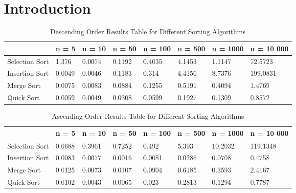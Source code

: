 \section{Introduction}

\begin{table}[ht]
    \centering
    \caption{Descending Order Results Table for Different Sorting Algorithms}
    \begin{tabular}[t]{|l| l l l l l l l|} 
    \hline
    & n = 5 & n = 10 & n = 50 & n = 100 & n = 500 & n = 1000 & n = 10 000\\ [0.5ex] 
    \hline
    Selection Sort & 1.376 &	0.0074 & 0.1192 & 0.4035 & 4.1453 & 1.1147 & 72.5723 \\ 
    \hline
    Insertion Sort &  0.0049 & 0.0046	& 0.1183	& 0.314 & 	4.4156	& 8.7376	& 199.0831\\
    \hline
    Merge Sort & 0.0075 &	0.0083	& 0.0884	& 0.1255	& 0.5191	& 0.4094	& 1.4769\\
    \hline
    Quick Sort & 0.0059	& 0.0049	& 0.0308	& 0.0599	& 0.1927	& 0.1309	& 0.8572\\
     \hline
    \end{tabular}
\end{table}

\begin{table}[ht]
    \centering
    \caption{Ascending Order Results Table for Different Sorting Algorithms}
    \begin{tabular}[t]{|l| l l l l l l l|} 
    \hline
    & n = 5 & n = 10 & n = 50 & n = 100 & n = 500 & n = 1000 & n = 10 000\\ [0.5ex] 
    \hline
    Selection Sort & 0.6688	& 0.3961 &	0.7252 &	0.492	 & 5.393 &	10.2032	& 119.1348 \\ 
    \hline
    Insertion Sort & 0.0083	& 0.0077 &	0.0016 &	0.0081 & 	0.0286	& 0.0708 &	0.4758\\
    \hline
    Merge Sort & 0.0125	& 0.0073 &	0.0107 &	0.0904 & 	0.6185	& 0.3593 &	2.4167\\
    \hline
    Quick Sort & 0.0102	& 0.0043 &	0.0065 &	0.023	 & 0.2813	& 0.1294 &	0.7787 \\
     \hline
    \end{tabular}
\end{table}

